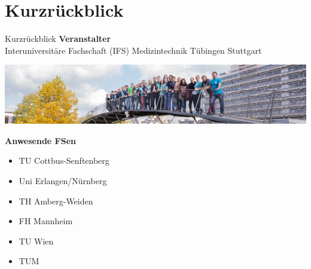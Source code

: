 \section{Kurzrückblick}
\begin{frame}{Kurzrückblick}
  \textbf{Veranstalter}\\
  Interuniversitäre Fachschaft (IFS) Medizintechnik
  Tübingen \textbar{} Stuttgart

  \includegraphics[width=\textwidth]{bruecke.jpg}

  \textbf{Anwesende FSen}\\
  \hspace*{0.1\textwidth}\parbox{0.88\textwidth}{
    \begin{itemize}
    \item TU Cottbus-Senftenberg
    \item Uni Erlangen/Nürnberg
    \item TH Amberg-Weiden
    \item FH Mannheim
    \item TU Wien
    \item TUM
    \end{itemize}}

\end{frame}
